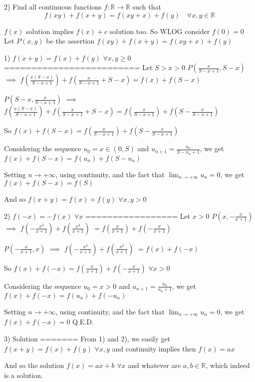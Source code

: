 \begin{solution}
	\begin{tcolorbox}2) Find all continuous functions $f:\mathbb{R}\to\mathbb{R}$ such that
\[f(xy)+f(x+y)=f(xy+x)+f(y) \quad \forall x,y\in \mathbb{R}\]\end{tcolorbox}
$f(x)$ solution implies $f(x)+c$ solution too. So WLOG consider $f(0)=0$
Let $P(x,y)$ be the assertion $f(xy)+f(x+y)=f(xy+x)+f(y)$

1) $f(x+y)=f(x)+f(y)$ $\forall x,y\ge 0$
=========================
Let $S>x>0$
$P(\frac x{S-x+1},S-x)$ $\implies$ $f(\frac{x(S-x)}{S-x+1})+f(\frac x{S-x+1}+S-x)=f(x)+f(S-x)$

$P(S-x,\frac x{S-x+1})$ $\implies$ $f(\frac{x(S-x)}{S-x+1})+f(\frac x{S-x+1}+S-x)=f(\frac x{S-x+1})+f(S-\frac x{S-x+1})$

So $f(x)+f(S-x)=f(\frac x{S-x+1})+f(S-\frac x{S-x+1})$

Considering the sequence $u_0=x\in(0,S)$ and $u_{n+1}=\frac {u_n}{S-u_n+1}$, we get $f(x)+f(S-x)=f(u_n)+f(S-u_n)$

Setting $n\to +\infty$, using continuity, and the fact that $\lim_{n\to+\infty}u_n=0$, we get $f(x)+f(S-x)=f(S)$

And so $f(x+y)=f(x)+f(y)$ $\forall x,y>0$ 

2) $f(-x)=-f(x)$ $\forall x$
=================
Let $x>0$
$P(x,-\frac x{x+1})$ $\implies$ $f(-\frac {x^2}{x+1})+f(\frac{x^2}{x+1})$ $=f(\frac x{x+1})+f(-\frac x{x+1})$

$P(-\frac x{x+1},x)$ $\implies$ $f(-\frac {x^2}{x+1})+f(\frac{x^2}{x+1})$ $=f(x)+f(-x)$

So $f(x)+f(-x)=f(\frac x{x+1})+f(-\frac x{x+1})$ $\forall x>0$

Considering the sequence $u_0=x>0$ and $u_{n+1}=\frac{u_n}{u_n+1}$, we get $f(x)+f(-x)=f(u_n)+f(-u_n)$

Setting $n\to +\infty$, using continuity, and the fact that $\lim_{n\to+\infty}u_n=0$, we get $f(x)+f(-x)=0$
Q.E.D.

3) Solution
=======
From 1) and 2), we easily get $f(x+y)=f(x)+f(y)$ $\forall x,y$ and continuity implies then $f(x)=ax$

And so the solution $\boxed{f(x)=ax+b}$ $\forall x$ and whatever are $a,b\in\mathbb R$, which indeed is a solution.
\end{solution}



